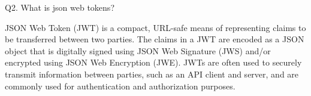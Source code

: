 
Q2. What is json web tokens?

    JSON Web Token (JWT) is a compact, URL-safe means of representing claims to be transferred
between two parties. The claims in a JWT are encoded as a JSON object that is 
digitally signed using JSON Web Signature (JWS) and/or encrypted using JSON Web 
Encryption (JWE). JWTs are often used to securely transmit information between
parties, such as an API client and server, and are commonly used for authentication 
and authorization purposes.